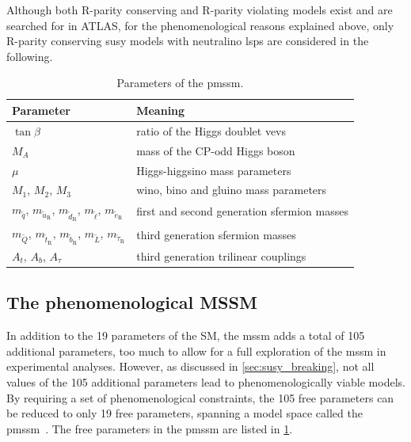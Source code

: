 Although both R-parity conserving and R-parity violating models exist and are searched for in ATLAS, for the phenomenological reasons explained above, only R-parity conserving \gls{susy} models with neutralino \glspl{lsp} are considered in the following.

\begin{table}
	\centering
	\setlength\heavyrulewidth{0.2ex}
	\small
	\caption{Parameters of the \gls{pmssm}.}
	\begin{tabular} {l l}
	\toprule
		Parameter & Meaning \\ 
	\midrule
	$\tan{\beta}$ & ratio of the Higgs doublet \glspl{vev} \\
	$M_A$ & mass of the CP-odd Higgs boson \\
	$\mu$ & Higgs-higgsino mass parameters \\
	$M_1$, $M_2$, $M_3$ & wino, bino and gluino mass parameters \\
	$m_{\tilde{q}}$, $m_{\tilde{u}_\mathrm{R}}$, $m_{\tilde{d}_\mathrm{R}}$, $m_{\tilde{\ell}}$, $m_{\tilde{e}_\mathrm{R}}$ & first and second generation sfermion masses \\
	$m_{\tilde{Q}}$, $m_{\tilde{t}_\mathrm{R}}$, $m_{\tilde{b}_\mathrm{R}}$, $m_{\tilde{L}}$, $m_{\tilde{\tau}_\mathrm{R}}$ & third generation sfermion masses \\
	$A_t$, $A_b$, $A_\tau$ & third generation trilinear couplings \\
	\bottomrule					
	\end{tabular}\vspace{3mm}
	\label{tab:parameters_pmssm}   
\end{table}

\subsection{The phenomenological MSSM}\label{sec:theory_pmssm}

In addition to the 19 parameters of the SM, the \gls{mssm} adds a total of 105 additional parameters, too much to allow for a full exploration of the \gls{mssm} in experimental analyses. However, as discussed in \cref{sec:susy_breaking}, not all values of the 105 additional parameters lead to phenomenologically viable models. By requiring a set of phenomenological constraints, the 105 free parameters can be reduced to only 19 free parameters, spanning a model space called the \gls{pmssm}~\cite{Djouadi:2002ze,Berger_2009}. The free parameters in the \gls{pmssm} are listed in \cref{tab:parameters_pmssm}.

